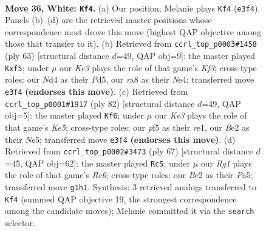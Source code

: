 \documentclass[11pt]{article}
\begin{document}
\clearpage

\begin{figure}[p]\centering
\begin{subfigure}{0.46\textwidth}\centering
\resizebox{\linewidth}{!}{%
\newchessgame
\chessboard[
  setfen={rn6/8/8/5p1p/3N3k/pP2K3/r3B3/6R1 w - - 2 36},
  showmover=false,
  pgfstyle=straightmove, color=movearrow, markmove={e3-f4}
]}
\caption{}
\end{subfigure}\hfill
\begin{subfigure}{0.46\textwidth}\centering
\resizebox{\linewidth}{!}{%
\newchessgame
\chessboard[
  setfen={2r5/1R6/p2b1k2/B2p1P2/4n3/PK1N4/1P6/8 b - - 0 32},
  showmover=false,
  pgfstyle=straightmove, color=movearrow, markmove={f6-f5}
]}
\caption{}
\end{subfigure}
\\[4pt]
\begin{subfigure}{0.46\textwidth}\centering
\resizebox{\linewidth}{!}{%
\newchessgame
\chessboard[
  setfen={2k5/Bp4R1/p1p5/2N1K3/P7/8/8/1r2r3 w - - 3 42},
  showmover=false,
  pgfstyle=straightmove, color=movearrow, markmove={e5-f6}
]}
\caption{}
\end{subfigure}\hfill
\begin{subfigure}{0.46\textwidth}\centering
\resizebox{\linewidth}{!}{%
\newchessgame
\chessboard[
  setfen={6k1/6p1/3n4/p2P4/R3b3/2r5/6PP/4R1K1 b - - 0 34},
  showmover=false,
  pgfstyle=straightmove, color=movearrow, markmove={c3-c5}
]}
\caption{}
\end{subfigure}
\caption{\textbf{Move 36, White: \texttt{Kf4}.} (a) Our position; Melanie plays \texttt{Kf4} (\texttt{e3f4}). Panels (b)--(d) are the retrieved master positions whose correspondence most drove this move (highest QAP objective among those that transfer to it). (b) Retrieved from \texttt{ccrl\_top\_p0003\#1458} (ply 63) [structural distance $d$=49, QAP obj=9]: the master played \texttt{Kxf5}; under $\mu$ our \emph{Ke3} plays the role of that game's \emph{Kf3}; cross-type roles: our \emph{N}d4 as their \emph{P}d5, our \emph{r}a8 as their \emph{N}e4; transferred move \texttt{e3f4} \textbf{(endorses this move)}. (c) Retrieved from \texttt{ccrl\_top\_p0001\#1917} (ply 82) [structural distance $d$=49, QAP obj=5]: the master played \texttt{Kf6}; under $\mu$ our \emph{Ke3} plays the role of that game's \emph{Ke5}; cross-type roles: our \emph{p}f5 as their \emph{r}e1, our \emph{B}e2 as their \emph{N}c5; transferred move \texttt{e3f4} \textbf{(endorses this move)}. (d) Retrieved from \texttt{ccrl\_top\_p0002\#3473} (ply 67) [structural distance $d$=45, QAP obj=62]: the master played \texttt{Rc5}; under $\mu$ our \emph{Rg1} plays the role of that game's \emph{Rc6}; cross-type roles: our \emph{B}e2 as their \emph{P}a5; transferred move \texttt{g1h1}. Synthesis: 3 retrieved analogs transferred to \texttt{Kf4} (summed QAP objective 19, the strongest correspondence among the candidate moves); Melanie committed it via the \texttt{search} selector.}
\label{fig:thought-m70}
\end{figure}
\end{document}
